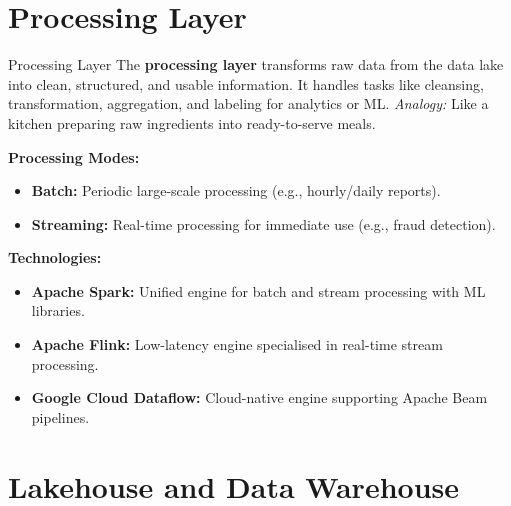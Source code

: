 \documentclass[aspectratio=169, table]{beamer}
\begin{document}
	
	\section{Processing Layer}
	
	\begin{frame}[fragile]{Processing Layer}
		\vspace{20pt}
		The \textbf{processing layer} transforms raw data from the data lake into clean, structured, and usable information. It handles tasks like cleansing, transformation, aggregation, and labeling for analytics or ML. \textit{Analogy:} Like a kitchen preparing raw ingredients into ready-to-serve meals.
		
		\vspace{6pt}
		\textbf{Processing Modes:}
		\begin{itemize}
			\item \textbf{Batch:} Periodic large-scale processing (e.g., hourly/daily reports).
			\item \textbf{Streaming:} Real-time processing for immediate use (e.g., fraud detection).
		\end{itemize}
		
		\vspace{4pt}
		\textbf{Technologies:}
		\begin{itemize}
			\item \textbf{Apache Spark:} Unified engine for batch and stream processing with ML libraries.
			\item \textbf{Apache Flink:} Low-latency engine specialised in real-time stream processing.
			\item \textbf{Google Cloud Dataflow:} Cloud-native engine supporting Apache Beam pipelines.
		\end{itemize}
	\end{frame}
	
	\section{Lakehouse and Data Warehouse}
	
\end{document}
